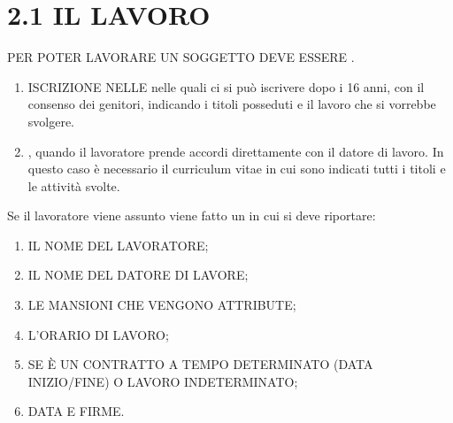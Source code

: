 \documentclass[letterpaper,10pt,italian]{sphinxmanual}
\begin{document}
\section{2.1 \sphinxhyphen{} IL LAVORO}
\label{\detokenize{2.DIRITTI ECONOMICI-LAVORO:il-lavoro}}
\sphinxAtStartPar
PER POTER LAVORARE UN SOGGETTO DEVE ESSERE .
\begin{description}
\begin{enumerate}
%
\item {} 
\sphinxAtStartPar
ISCRIZIONE NELLE  nelle quali ci si può iscrivere dopo i 16 anni, con il consenso dei genitori, indicando i titoli posseduti e il lavoro che si vorrebbe svolgere.

\item {} 
\sphinxAtStartPar
{}, quando il lavoratore prende accordi direttamente con il datore di lavoro. In questo caso è necessario il curriculum vitae in cui sono indicati tutti i titoli e le attività svolte.

\end{enumerate}

\end{description}

\sphinxAtStartPar
Se il lavoratore viene assunto viene fatto un  in cui si deve riportare:
\begin{enumerate}
%
\item {} 
\sphinxAtStartPar
IL NOME DEL LAVORATORE;

\item {} 
\sphinxAtStartPar
IL NOME DEL DATORE DI LAVORE;

\item {} 
\sphinxAtStartPar
LE MANSIONI CHE VENGONO ATTRIBUTE;

\item {} 
\sphinxAtStartPar
L’ORARIO DI LAVORO;

\item {} 
\sphinxAtStartPar
SE È UN CONTRATTO A TEMPO DETERMINATO (DATA INIZIO/FINE) O LAVORO INDETERMINATO;

\item {} 
\sphinxAtStartPar
DATA E FIRME.

\end{enumerate}
\end{document}
